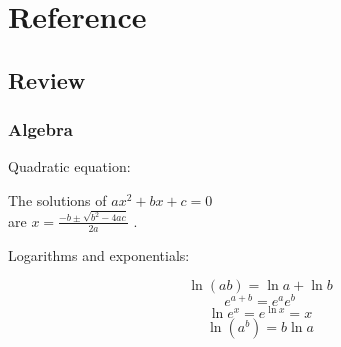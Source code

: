\setcounter{chapter}{5}
\setcounter{section}{1}
{}
\chapter*{Reference}
{}
\section*{Review}

\newcommand{\mathsummaryfont}{\normalsize\normalfont\small}
\newenvironment{ind}
	{%
	}
	{%
	}

\mathsummaryfont

\subsection{Algebra}

\noindent Quadratic equation:

\begin{ind}
  The solutions of $ax^2+bx+c=0$ \\
  are $x=\frac{-b\pm\sqrt{b^2-4ac}}{2a}$ \quad .
\end{ind}

\noindent Logarithms and exponentials:

\begin{ind}
  \begin{equation*}   \ln(ab)=\ln a + \ln b    \end{equation*}
  \begin{equation*}   e^{a+b} = e^ae^b    \end{equation*}
  \begin{equation*}   \ln e^x = e^{\ln x} = x    \end{equation*}
  \begin{equation*}   \ln(a^b) = b \ln a    \end{equation*}
\end{ind}

